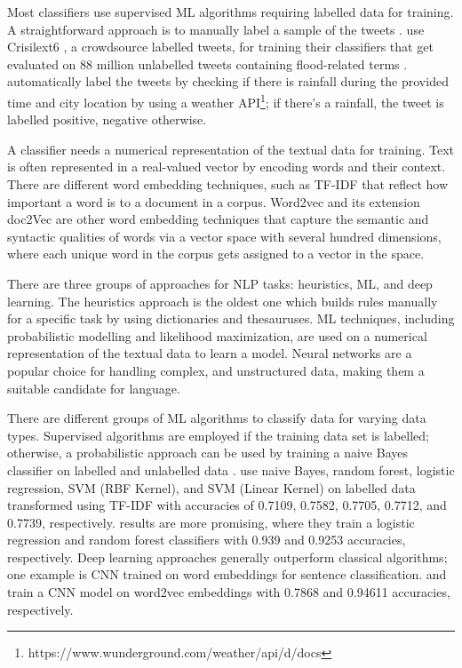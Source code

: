 Most classifiers use supervised \ac{ML} algorithms requiring labelled data for training. A
straightforward approach is to manually label a sample of the tweets
\cite{debruijnGlobalDatabaseHistoric2019b}\cite{barkerDevelopmentNationalscaleRealtime2019}.
 use Crisilext6
\cite{olteanuCrisisLexLexiconCollecting2014}, a crowdsource labelled tweets, for training their
classifiers that get evaluated on 88 million unlabelled tweets containing flood-related terms
\cite{DVN/T3ZFMR_2019}.  automatically label the tweets by
checking if there is rainfall during the provided time and city location by using a weather
\ac{API}\footnote{https://www.wunderground.com/weather/api/d/docs}; if there's a rainfall, the tweet
is labelled positive, negative otherwise.

A classifier needs a numerical representation of the textual data for training. Text is often
represented in a real-valued vector by encoding words and their context. There are different word
embedding techniques, such as \ac{TF-IDF} \cite{enwiki:1123031029} that reflect how important a word
is to a document in a corpus. Word2vec \cite{mikolovEfficientEstimationWord2013} and its extension
doc2Vec \cite{leDistributedRepresentationsSentences2014} are other word embedding techniques that
capture the semantic and syntactic qualities of words via a vector space with several hundred
dimensions, where each unique word in the corpus gets assigned to a vector in the space.

There are three groups of approaches for \ac{NLP} tasks: heuristics, \ac{ML}, and deep
learning. The heuristics approach is the oldest one which builds rules manually for a specific task
by using dictionaries and thesauruses. \ac{ML} techniques, including probabilistic
modelling and likelihood maximization, are used on a numerical representation of the textual data to
learn a model. Neural networks are a popular choice for handling complex, and unstructured data,
making them a suitable candidate for language.

There are different groups of \ac{ML} algorithms to classify data for varying data types. Supervised
algorithms are employed if the training data set is labelled; otherwise, a probabilistic approach
can be used by training a naive Bayes classifier on  labelled and unlabelled data
\cite{liDisasterResponseAided2018}.  use naive Bayes,
random forest, logistic regression, \ac{SVM} (RBF Kernel), and \ac{SVM} (Linear Kernel) on labelled
data transformed using \ac{TF-IDF} with accuracies of 0.7109, 0.7582, 0.7705, 0.7712, and 0.7739,
respectively.  results are more promising,
where they train a logistic regression and random forest classifiers with 0.939 and 0.9253
accuracies, respectively. Deep learning approaches  generally outperform classical algorithms; one
example is \ac{CNN} trained on word embeddings for sentence classification.
 and
 train a \ac{CNN} model on word2vec
embeddings with 0.7868 and 0.94611 accuracies, respectively.


